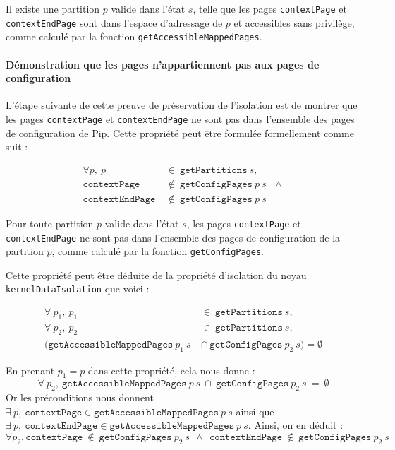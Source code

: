 			\begin{theorem}
				Il existe une partition $p$ valide dans l'état $s$, telle que les pages \texttt{contextPage} et \texttt{contextEndPage} sont dans l'espace d'adressage de $p$ et accessibles sans privilège, comme calculé par la fonction \texttt{getAccessibleMappedPages}.
			\end{theorem}

			\paragraph{Démonstration que les pages n'appartiennent pas aux pages de configuration}

			L'étape suivante de cette preuve de préservation de l'isolation est de montrer que les pages \texttt{contextPage} et \texttt{contextEndPage} ne sont pas dans l'ensemble des pages de configuration de Pip. Cette propriété peut être formulée formellement comme suit :

			\begin{align*}
				\forall p,~p~&\in~\mathtt{getPartitions}~s,\\
				\mathtt{contextPage}~&\notin~\mathtt{getConfigPages}~p~s~~~\wedge\\
				\mathtt{contextEndPage}~&\notin~\mathtt{getConfigPages}~p~s
			\end{align*}

			\begin{theorem}
				Pour toute partition $p$ valide dans l'état $s$, les pages \texttt{contextPage} et \texttt{contextEndPage} ne sont pas dans l'ensemble des pages de configuration de la partition $p$, comme calculé par la fonction \texttt{getConfigPages}.
			\label{prop:pagesnotconfig}
			\end{theorem}

			Cette propriété peut être déduite de la propriété d'isolation du noyau \texttt{kernelDataIsolation} que voici :

			\begin{align*}
				\forall~p_1,~p_1~&\in~\mathtt{getPartitions}~s,\\
				\forall~p_2,~p_2~&\in~\mathtt{getPartitions}~s,\\
				(\mathtt{getAccessibleMappedPages}~p_1~s~&\cap~\mathtt{getConfigPages}~p_2~s) = \emptyset
			\end{align*}

			En prenant $p_1 = p$ dans cette propriété, cela nous donne : 
			$$\forall~p_2,~\mathtt{getAccessibleMappedPages}~p~s~\cap~\mathtt{getConfigPages}~p_2~s~=~\emptyset$$
			Or les préconditions nous donnent $\exists~p,~\mathtt{contextPage} \in \mathtt{getAccessibleMappedPages}~p~s$ ainsi que $\exists~p,~\mathtt{contextEndPage} \in \mathtt{getAccessibleMappedPages}~p~s$. Ainsi, on en déduit :
			$$\forall p_2, \mathtt{contextPage}~\notin~\mathtt{getConfigPages}~p_2~s~~\wedge~~\mathtt{contextEndPage}~\notin~\mathtt{getConfigPages}~p_2~s$$


